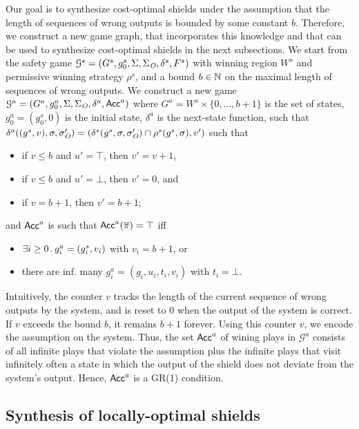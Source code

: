 Our goal is to synthesize cost-optimal shields under the assumption that the length of sequences of wrong outputs is bounded by some
constant $b$. Therefore, we construct a new game graph, that incorporates this knowledge and that can be used to synthesize
cost-optimal shields in the next subsections.
%
We start from the safety game $\mathcal G^s = (G^s, g_0^s,\Sigma,\Sigma_{\textit{O}},\delta^s,F^s)$ with winning region $W^s$ and permissive winning strategy $\rho^s$, and a bound $b\in\mathbb{N}$ on the maximal length of sequences of wrong outputs.
%
We construct a new game $\mathcal G^{a} = (G^{a}, g_0^{a},\Sigma,\Sigma_{\textit{O}},\delta^{a},\mathsf{Acc}^{a})$
where $G^{a} = W^s \times \{0,\ldots,b+1\}$ is the set of states,
$g_0^{a} = (g_0^s,0)$ is the initial state,
$\delta^{a}$ is the next-state function, such that
%
$\delta^{a}((g^s,v),\sigma,\sigma_{\textit{O}}')=( \delta^s(g^s, \sigma,\sigma_{\textit{O}}')\cap\rho^s(g^s, \sigma),v')$ such that
\begin{itemize}
\item if $v \leq b$ and $u'=\top$, then $v' = v+1$,
\item if $v \leq b$ and $u'=\bot$, then $v' = 0$, and
\item if $v = b +1$, then $v' = b+1$; 
\end{itemize}
and $\mathsf{Acc}^{a}$ is such that  $\mathsf{Acc}^{a}(\overline{\pi})=\top$ iff
\begin{itemize}
\item $\exists i \geq 0 \operatorname{\mathbin{.}} g_i^{a}= (g^s_i,v_i)$ with $v_i = b+1$, or
\item there are inf. many $g_i^{a}= (g_i,u_i, t_i, v_i)$ with $t_i = \bot$.
\end{itemize}

Intuitively, the counter $v$ tracks the length of the current sequence of wrong outputs by the system, and is reset to $0$ when the output of the system is correct. If $v$ exceeds the bound $b$, it remains $b+1$ forever.
Using this counter $v$, we encode the assumption on the system. Thus, the set $\mathsf{Acc}^a$ of wining plays in $\mathcal G^a$ consists of all infinite plays that violate the assumption plus the infinite plays that visit infinitely often a state in which the output of the shield does not deviate from the system's output. Hence, $\mathsf{Acc}^a$ is a GR(1)  condition.

\subsection{Synthesis of locally-optimal shields}\label{sec:shieldsynth-local}

